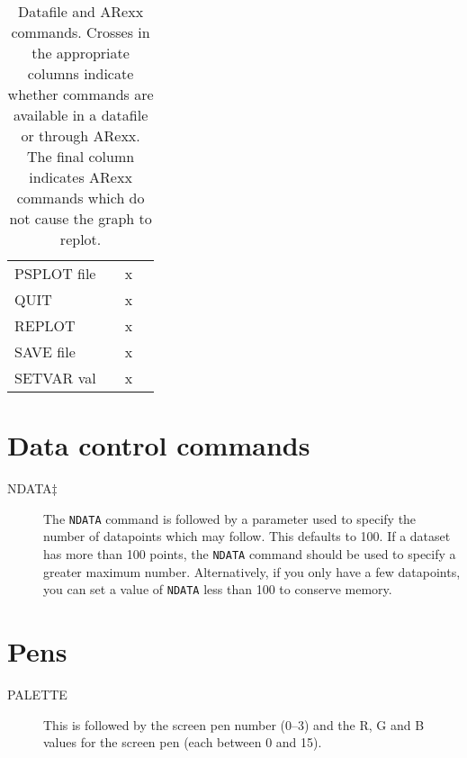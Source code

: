 \begin{table}[h]
\begin{center}
\begin{tabular}{lccc}
PSPLOT  file                     &           &     x  &                    \\
QUIT                             &           &     x  &                    \\
REPLOT                           &           &     x  &                    \\
SAVE  file                       &           &     x  &                    \\
SETVAR  val                      &           &     x  &                    \\ \hline
\end{tabular}           
\end{center}
\caption[Datafile and ARexx commands]{\label{tab:commands}Datafile and ARexx 
commands. Crosses 
in the appropriate columns indicate whether commands are available in a 
datafile or through ARexx. The final column indicates ARexx commands 
which do not cause the graph to replot.}
\end{table}
\clearpage

\section{Data control commands}
\begin{description}
\item[NDATA$\ddag$] The {\tt NDATA} command is followed by a parameter used to specify 
the number of datapoints which may 
follow. This defaults to 100. If a dataset has more than 100 points, the {\tt NDATA}
command should be used to specify a greater maximum number. Alternatively, if you 
only have a few datapoints, you can set a value of {\tt NDATA} less than 100 
to conserve memory.
\end{description}

\section{Pens}
\begin{description}
\item[PALETTE] This is followed by the screen pen number (0--3) and the R, G and B 
values for the screen pen (each between 0 and 15).
\end{description}

